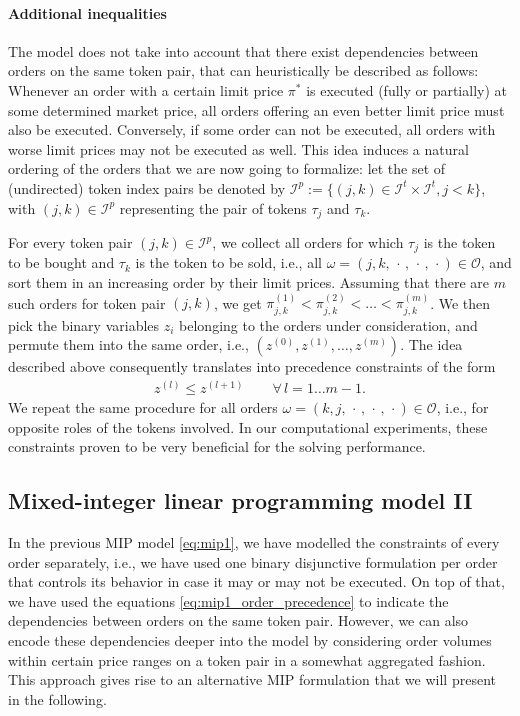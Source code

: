 \documentclass[11pt,parskip=full]{scrartcl}%
\newcommand*{\ie}{i.e., }
\newcommand*{\orders}{\mathcal{O}}          %
\newcommand*{\itokens}{\mathcal{I}^t}       %
\newcommand*{\itokenpairs}{\mathcal{I}^p}   %
\begin{document}
\vspace{-.5cm}
\paragraph{Additional inequalities}

The model does not take into account that there exist dependencies between orders on the same token
pair, that can heuristically be described as follows:
Whenever an order with a certain limit price $ \pi^* $ is executed (fully or partially) at some
determined market price, all orders offering an even better limit price must also be executed.
Conversely, if some order can not be executed, all orders with worse limit prices may not be
executed as well.
This idea induces a natural ordering of the orders that we are now going to formalize:
let the set of (undirected) token index pairs be denoted by
$ \itokenpairs := \{(j,k) \in \itokens \times \itokens, j < k\} $, with $ (j,k) \in \itokenpairs $
representing the pair of tokens $ \tau_j $ and $ \tau_k $.

For every token pair $ (j,k) \in \itokenpairs $, we collect all orders for which $ \tau_j $ is the
token to be bought and $ \tau_k $ is the token to be sold, \ie all
$ \omega = (j, k,\, \cdot \,,\, \cdot \,,\, \cdot) \in \orders $,
and sort them in an increasing order by their limit prices.
Assuming that there are $ m $ such orders for token pair $ (j,k) $, we get
$ \pi^{(1)}_{j,k} < \pi^{(2)}_{j,k} < \ldots < \pi^{(m)}_{j,k} $.
We then pick the binary variables $ z_i $ belonging to the orders under consideration, and permute
them into the same order, \ie $ (z^{(0)}, z^{(1)}, \ldots, z^{(m)}) $.
The idea described above consequently translates into precedence constraints of the form
\begin{align}
  z^{(l)} \le z^{(l+1)} \qquad \forall \, l = 1 \ldots m\!-\!1.
  \label{eq:mip1_order_precedence}
\end{align}
We repeat the same procedure for all orders
$ \omega = (k, j,\, \cdot \,,\, \cdot \,,\, \cdot) \in \orders $,
\ie for opposite roles of the tokens involved.
In our computational experiments, these constraints proven to be very beneficial for the solving
performance.


\newpage
\subsection{Mixed-integer linear programming model II}
\label{subsec:MIP2}

In the previous MIP model \eqref{eq:mip1}, we have modelled the constraints of every order
separately, \ie we have used one binary disjunctive formulation per order that controls its
behavior in case it may or may not be executed.
On top of that, we have used the equations \eqref{eq:mip1_order_precedence} to indicate the
dependencies between orders on the same token pair.
However, we can also encode these dependencies deeper into the model by considering order volumes
within certain price ranges on a token pair in a somewhat aggregated fashion.
This approach gives rise to an alternative MIP formulation that we will present in the following.
\end{document}
